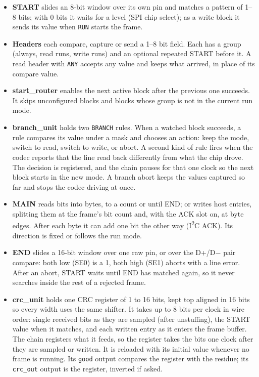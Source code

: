 \documentclass[11pt,a4paper]{article}
\newcommand{\sig}[1]{\texttt{#1}}
\begin{document}
\begin{itemize}
\item \textbf{START} slides an 8-bit window over its own pin and matches a pattern of 1--8 bits; with 0 bits it waits for a level (SPI chip select); as a write block it sends its value when \sig{RUN} starts the frame.
\item \textbf{Headers} each compare, capture or send a 1--8 bit field. Each has a group (always, read runs, write runs) and an optional repeated START before it. A read header with \sig{ANY} accepts any value and keeps what arrived, in place of its compare value.
\item \textbf{start\_router} enables the next active block after the previous one succeeds. It skips unconfigured blocks and blocks whose group is not in the current run mode.
\item \textbf{branch\_unit} holds two \sig{BRANCH} rules. When a watched block succeeds, a rule compares its value under a mask and chooses an action: keep the mode, switch to read, switch to write, or abort. A second kind of rule fires when the codec reports that the line read back differently from what the chip drove. The decision is registered, and the chain pauses for that one clock so the next block starts in the new mode. A branch abort keeps the values captured so far and stops the codec driving at once.
\item \textbf{MAIN} reads bits into bytes, to a count or until END; or writes host entries, splitting them at the frame's bit count and, with the ACK slot on, at byte edges. After each byte it can add one bit the other way (I\textsuperscript{2}C ACK). Its direction is fixed or follows the run mode.
\item \textbf{END} slides a 16-bit window over one raw pin, or over the D+/D$-$ pair compare: both low (SE0) is a 1, both high (SE1) aborts with a line error. After an abort, START waits until END has matched again, so it never searches inside the rest of a rejected frame.
\item \textbf{crc\_unit} holds one CRC register of 1 to 16 bits, kept top aligned in 16 bits so every width uses the same shifter. It takes up to 8 bits per clock in wire order: single received bits as they are sampled (after unstuffing), the START value when it matches, and each written entry as it enters the frame buffer. The chain registers what it feeds, so the register takes the bits one clock after they are sampled or written. It is reloaded with its initial value whenever no frame is running. Its \sig{good} output compares the register with the residue; its \sig{crc\_out} output is the register, inverted if asked.

\end{itemize}
\end{document}
